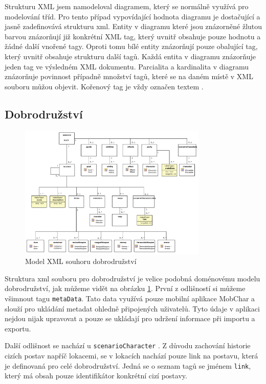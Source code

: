 \documentclass[thesis=B,czech]{resources/FITthesis}[2012/06/26]
\begin{document}
Strukturu XML jsem namodeloval diagramem, který se normálně využívá pro modelování tříd. Pro tento případ vypovídající hodnota diagramu je dostačující a jasně zadefinovává strukturu xml. Entity v diagramu které jsou znázorněné žlutou barvou znázorňují již konkrétní XML tag, který uvnitř obsahuje pouze hodnotu a žádné další vnořené tagy. Oproti tomu bílé entity znázorňují pouze obalující tag, který uvnitř obsahuje strukturu další tagů. Každá entita v diagramu znázorňuje jeden tag ve výsledném XML dokumentu. Parcialita a kardinalita v diagramu znázorňuje povinnost případně množství tagů, které se na daném místě v XML souboru můžou objevit. Kořenový tag je vždy označen textem   .

\subsection{Dobrodružství}
\begin{figure}\centering
	\includegraphics[width=0.8\textwidth]{images/scenarioXML}
	\caption[Model XML souhoru dobrodružství]{Model XML souhoru dobrodružství}\label{fig:xml_scenario}
\end{figure}
Struktura xml souboru pro dobrodružství je velice podobná doménovému modelu dobrodružství, jak můžeme vidět na obrázku \ref{fig:xml_scenario}. První z odlišností si můžeme všimnout tagu \texttt{metaData}. Tato data využívá pouze mobilní aplikace MobChar a slouží pro ukládání metadat ohledně připojených uživatelů. Tyto údaje v aplikaci nejdou nijak upravovat a pouze se ukládají pro udržení informace při importu a exportu. \par

Další odlišnost se nachází u \texttt{scenarioCharacter} . Z důvodu zachování historie cizích postav napříč lokacemi, se v lokacích nachází pouze link na postavu, která je definovaná pro celé dobrodružství. Jedná se o seznam tagů se jménem \texttt{link}, který má obsah pouze identifikátor konkrétní cizí postavy. \par
\end{document}
